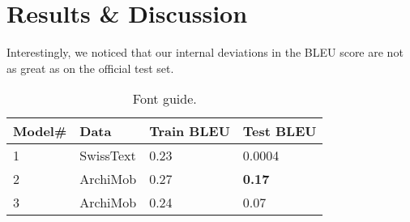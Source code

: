 \section{Results \& Discussion}

Interestingly, we noticed that our internal deviations in the BLEU score are not as great as on the official test set. 

\begin{table}[H]
    \centering
    \begin{tabular}{llll}
    \hline\textbf{Model\#}    & \textbf{Data} & \textbf{Train BLEU}   & \textbf{Test BLEU} \\\hline   %
    1                   & SwissText     & 0.23                  & 0.0004                \\%
    2                   & ArchiMob      & 0.27                  & \textbf{0.17}         \\%
    3                   & ArchiMob      & 0.24                  & 0.07                  \\%
    \hline
    \end{tabular}
    \caption{\label{font-table} Font guide. }
\end{table}

